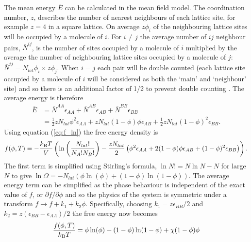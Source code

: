 The mean energy $\bar{E}$ can be calculated in the mean field model. The coordination number, $z$, describes the number of nearest neighbours of each lattice site, for example $z=4$ in a square lattice. On average $z\phi_i$ of the neighbouring lattice sites will be occupied by a molecule of $i$. For $i \neq j$ the average number of $ij$ neighbour pairs, $\bar{N}^{ij}$, is the number of sites occupied by a molecule of $i$ multiplied by the average the number of neighbouring lattice sites occupied by a molecule of $j$: $\bar{N}^{ij} = N_{lat}\phi_i \times z\phi_j$. When $i=j$ each pair will be double counted (each lattice site occupied by a molecule of $i$ will be considered as both the `main' and `neighbour' site) and so there is an additional factor of 1/2 to prevent double counting \cite{doi_soft_2013}. The average energy is therefore
\begin{equation}
\begin{split}
    \bar{E} &= \bar{N}^{AA}\epsilon_{AA} + \bar{N}^{AB}\epsilon_{AB} + \bar{N}^{BB}\epsilon_{BB}\\
    &= \frac{1}{2}z N_{lat} \phi^2\epsilon_{AA} + z N_{lat} (1-\phi)\phi\epsilon_{AB} + \frac{1}{2}z N_{lat} (1-\phi)^2 \epsilon_{BB}.
\end{split}
\end{equation}
Using equation (\ref{eq:f_ln}) the free energy density is
\begin{equation}
    f(\phi, T) = -\frac{k_{\rm B} T}{V}\left(\ln \left(\frac{N_{lat}!}{N_A! N_B!} \right) - \frac{z N_{lat}}{2} \left(\phi^2\epsilon_{AA} + 2(1-\phi)\phi\epsilon_{AB} + (1-\phi)^2 \epsilon_{BB}\right)\right).
\end{equation}
The first term is simplified using Stirling's formula, $\ln N! = N \ln N - N$ for large $N$ to give $\ln\Omega=-N_{lat}(\phi\ln(\phi)+(1-\phi)\ln(1-\phi))$. The average energy term can be simplified as the phase behaviour is independent of the exact value of $f$, or $\partial f/\partial \phi$ and so the physics of the system is symmetric under a transform $f \rightarrow f + k_1 + k_2\phi$. Specifically, choosing $k_1 = z\epsilon_{BB}/2$ and $k_2 = z(\epsilon_{BB} - \epsilon_{AA})/2$ the free energy now becomes
\begin{equation}
    \frac{f(\phi, T)}{k_{\rm B} T} = \phi\ln(\phi)+(1-\phi)\ln(1-\phi) + \chi(1-\phi)\phi
    \label{eq:fh_free}
\end{equation}
